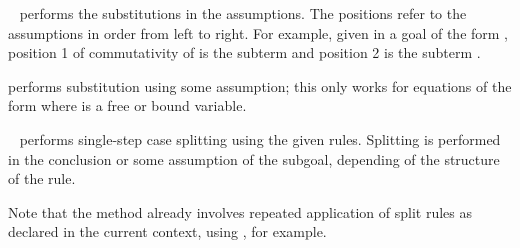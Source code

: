 \begin{isabellebody}
\begin{isamarkuptext}
\begin{description}
  \item \hyperlink{method.subst}{\mbox{}}~ performs the
  substitutions in the assumptions. The positions refer to the
  assumptions in order from left to right.  For example, given in a
  goal of the form , position 1 of
  commutativity of  is the subterm  and
  position 2 is the subterm .

  \item \hyperlink{method.hypsubst}{\mbox{}} performs substitution using some
  assumption; this only works for equations of the form  where  is a free or bound variable.

  \item \hyperlink{method.split}{\mbox{}}~ performs single-step case
  splitting using the given rules.  Splitting is performed in the
  conclusion or some assumption of the subgoal, depending of the
  structure of the rule.
  
  Note that the \hyperlink{method.simp}{\mbox{}} method already involves repeated
  application of split rules as declared in the current context, using
  \hyperlink{attribute.split}{\mbox{}}, for example.


\end{description}
\end{isamarkuptext}
\end{isabellebody}
